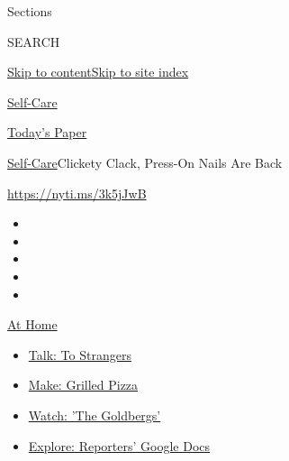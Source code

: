 Sections

SEARCH

\protect\hyperlink{site-content}{Skip to
content}\protect\hyperlink{site-index}{Skip to site index}

\href{https://www.nytimes3xbfgragh.onion/section/style/self-care/}{Self-Care}

\href{https://myaccount.nytimes3xbfgragh.onion/auth/login?response_type=cookie\&client_id=vi}{}

\href{https://www.nytimes3xbfgragh.onion/section/todayspaper}{Today's
Paper}

\href{/section/style/self-care/}{Self-Care}\textbar{}Clickety Clack,
Press-On Nails Are Back

\href{https://nyti.ms/3k5jJwB}{https://nyti.ms/3k5jJwB}

\begin{itemize}
\item
\item
\item
\item
\item
\end{itemize}

\href{https://www.nytimes3xbfgragh.onion/spotlight/at-home?action=click\&pgtype=Article\&state=default\&region=TOP_BANNER\&context=at_home_menu}{At
Home}

\begin{itemize}
\tightlist
\item
  \href{https://www.nytimes3xbfgragh.onion/2020/08/03/well/family/the-benefits-of-talking-to-strangers.html?action=click\&pgtype=Article\&state=default\&region=TOP_BANNER\&context=at_home_menu}{Talk:
  To Strangers}
\item
  \href{https://www.nytimes3xbfgragh.onion/2020/08/01/at-home/coronavirus-make-pizza-on-a-grill.html?action=click\&pgtype=Article\&state=default\&region=TOP_BANNER\&context=at_home_menu}{Make:
  Grilled Pizza}
\item
  \href{https://www.nytimes3xbfgragh.onion/2020/07/31/arts/television/goldbergs-abc-stream.html?action=click\&pgtype=Article\&state=default\&region=TOP_BANNER\&context=at_home_menu}{Watch:
  'The Goldbergs'}
\item
  \href{https://www.nytimes3xbfgragh.onion/interactive/2020/at-home/even-more-reporters-editors-diaries-lists-recommendations.html?action=click\&pgtype=Article\&state=default\&region=TOP_BANNER\&context=at_home_menu}{Explore:
  Reporters' Google Docs}
\end{itemize}

